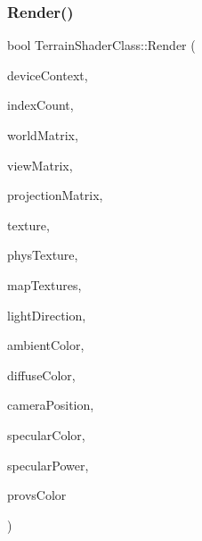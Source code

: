 \subsubsection{\texorpdfstring{Render()}{Render()}}
{\footnotesize\ttfamily bool Terrain\+Shader\+Class\+::\+Render (\begin{DoxyParamCaption}\item[{I\+D3\+D11\+Device\+Context $\ast$}]{device\+Context,  }\item[{int}]{index\+Count,  }\item[{D3\+D\+X\+M\+A\+T\+R\+IX}]{world\+Matrix,  }\item[{D3\+D\+X\+M\+A\+T\+R\+IX}]{view\+Matrix,  }\item[{D3\+D\+X\+M\+A\+T\+R\+IX}]{projection\+Matrix,  }\item[{I\+D3\+D11\+Shader\+Resource\+View $\ast$}]{texture,  }\item[{I\+D3\+D11\+Shader\+Resource\+View $\ast$}]{phys\+Texture,  }\item[{I\+D3\+D11\+Shader\+Resource\+View $\ast$$\ast$}]{map\+Textures,  }\item[{D3\+D\+X\+V\+E\+C\+T\+O\+R3}]{light\+Direction,  }\item[{D3\+D\+X\+V\+E\+C\+T\+O\+R4}]{ambient\+Color,  }\item[{D3\+D\+X\+V\+E\+C\+T\+O\+R4}]{diffuse\+Color,  }\item[{D3\+D\+X\+V\+E\+C\+T\+O\+R3}]{camera\+Position,  }\item[{D3\+D\+X\+V\+E\+C\+T\+O\+R4}]{specular\+Color,  }\item[{float}]{specular\+Power,  }\item[{D3\+D\+X\+V\+E\+C\+T\+O\+R4 $\ast$}]{provs\+Color }\end{DoxyParamCaption})}

